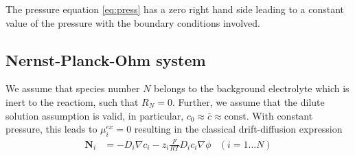 \documentclass[12pt,oneside,reqno]{amsart}
\numberwithin{equation}{section}
\begin{document}
 The pressure equation \eqref{eq:press} has a zero right hand side leading to a
 constant value of the pressure with the boundary conditions involved.

\subsection{Nernst-Planck-Ohm system}

We assume that species number $N$ belongs to the background electrolyte which
is inert to  the reactiom, such that $R_N=0$. Further, we assume that 
the dilute solution assumption is valid, in particular, $c_0\approx\bar c\approx \mathrm{const}$.
With constant pressure, this leads to $\mu_i^{ex}=0$ resulting in 
the classical drift-diffusion expression
\begin{align}
  \mathbf N_i &= -D_i \nabla c_i  - z_i \frac{F}{RT} D_i c_i \nabla \phi \label{eq:ddflux} & (i=1\dots N)
\end{align}
\end{document}
